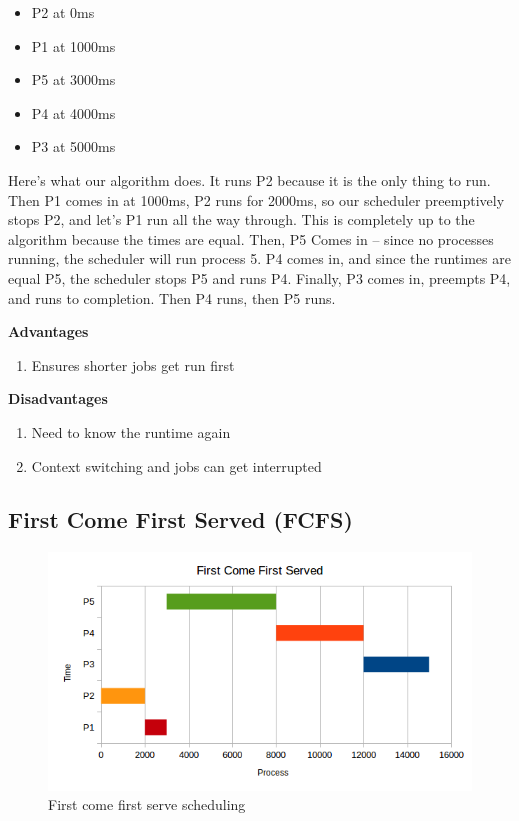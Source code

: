 \begin{itemize}
\tightlist
\item
  P2 at 0ms
\item
  P1 at 1000ms
\item
  P5 at 3000ms
\item
  P4 at 4000ms
\item
  P3 at 5000ms
\end{itemize}

Here's what our algorithm does.
It runs P2 because it is the only thing to run.
Then P1 comes in at 1000ms, P2 runs for 2000ms, so our scheduler preemptively stops P2, and let's P1 run all the way through.
This is completely up to the algorithm because the times are equal.
Then, P5 Comes in -- since no processes running, the scheduler will run process 5.
P4 comes in, and since the runtimes are equal P5, the scheduler stops P5 and runs P4.
Finally, P3 comes in, preempts P4, and runs to completion.
Then P4 runs, then P5 runs.

\textbf{Advantages}

\begin{enumerate}
  \item Ensures shorter jobs get run first
\end{enumerate}

\textbf{Disadvantages}

\begin{enumerate}
  \item Need to know the runtime again
  \item Context switching and jobs can get interrupted
\end{enumerate}

\subsection{First Come First Served (FCFS)}

\begin{figure}[htbp]
\centering
\includegraphics[width=\textwidth]{scheduling/images/fcfs.png}
\caption{First come first serve scheduling}
\end{figure}

